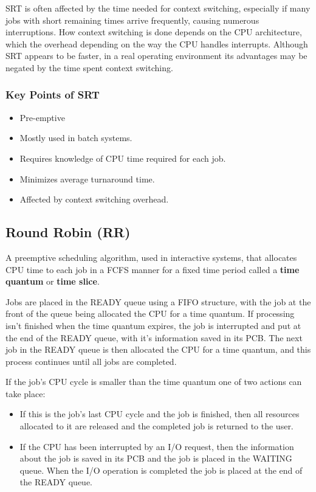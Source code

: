 \documentclass[12pt letter]{report}
\begin{document}
SRT is often affected by the time needed for context switching, especially if
many jobs with short remaining times arrive frequently, causing
numerous interruptions. How context switching is done depends on the
CPU architecture, which the overhead depending on the way the CPU
handles interrupts. Although SRT appears to be faster, in a real
operating environment its advantages may be negated by the time spent
context switching.

\subsubsection{Key Points of SRT}
\begin{itemize}
  \item Pre-emptive
  \item Mostly used in batch systems.
  \item Requires knowledge of CPU time required for each job.
  \item Minimizes average turnaround time.
  \item Affected by context switching overhead.
\end{itemize}

\subsection{Round Robin (RR)}
A preemptive scheduling algorithm, used in interactive systems, that
allocates CPU time to each job in a FCFS manner for a fixed time
period called a \textbf{time quantum} or \textbf{time slice}.

Jobs are placed in the READY queue using a FIFO structure, with the
job at the front of the queue being allocated the CPU for a time
quantum. If processing isn't finished when the time quantum expires,
the job is interrupted and put at the end of the READY queue, with
it's information saved in its PCB. The next job in the READY queue is
then allocated the CPU for a time quantum, and this process continues
until all jobs are completed.

If the job's CPU cycle is smaller than the time quantum one of two
actions can take place:
\begin{itemize}
  \item If this is the job's last CPU cycle and the job is finished,
    then all resources allocated to it are released and the completed
    job is returned to the user.
  \item If the CPU has been interrupted by an I/O request, then the
    information about the job is saved in its PCB and the job is
    placed in the WAITING queue. When the I/O operation is completed
    the job is placed at the end of the READY queue.
\end{itemize}
\end{document}
